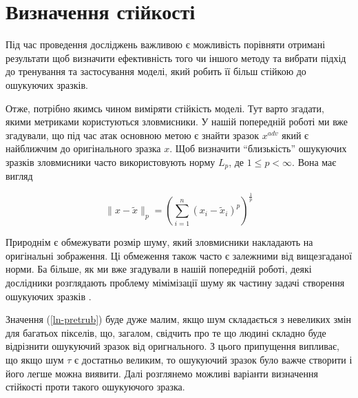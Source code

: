 \documentclass[14pt,a4paper]{extarticle}
\newcounter{e}
\numberwithin{equation}{section}
\numberwithin{figure}{section}
\begin{document}

 
 
 \newpage
 \thispagestyle{empty}
 \section{Визначення стійкості}
 
 Під час проведення досліджень важливою є можливість порівняти отримані результати щоб визначити ефективність того чи іншого методу та вибрати підхід до тренування та застосування моделі, який робить її більш стійкою до ошукуючих зразків.
 
 Отже, потрібно якимсь чином виміряти стійкість моделі. Тут варто згадати, якими метриками користуються зловмисники. У нашій попередній роботі \cite{my-work} ми вже згадували, що під час атак основною метою є знайти зразок $x^{adv}$ який є найближчим до оригінального зразка $x$.
 Щоб визначити ``близькість'' ошукуючих зразків зловмисники часто використовують норму  $L_p$, де $1 \leq p<\infty$. Вона має вигляд
 
 \begin{equation}
 \label{ln-pretrub}
 \|x-\tilde{x}\|_{p}=\left(\sum_{i=1}^{n}\left(x_{i}-\tilde{x}_{i}\right)^{p}\right)^{\frac{1}{p}}
 \end{equation}
 
 Природнім є обмежувати розмір шуму, який зловмисники накладають на оригінальні зображення. Ці обмеження також часто є залежними від вищезгаданої норми. Ба більше, як ми вже згадували в нашій попередній роботі, деякі дослідники розглядають проблему мімімізації шуму як частину задачі створення ошукуючих зразків \cite{C-and-W}.
 
 Значення (\ref{ln-pretrub}) буде дуже малим, якщо шум складається з невеликих змін для багатьох пікселів, що, загалом, свідчить про те що людині складно буде відрізнити ошукуючий зразок від оригнального. З цього припущення випливає, що якщо шум $\tau$ є достатньо великим, то ошукуючий зразок було важче створити і його легше можна виявити.
 Далі розглянемо можливі варіанти визначення стійкості проти такого ошукуючого зразка.
 
\end{document}

